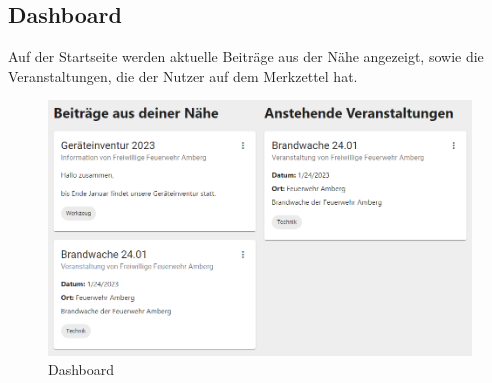 \subsection{Dashboard}
\label{sec:dashboard}

Auf der Startseite werden aktuelle Beiträge aus der Nähe angezeigt, sowie die Veranstaltungen, die der Nutzer auf dem Merkzettel hat.

\begin{figure}[ht!]
  \begin{centering}
    \includegraphics[width=.8\textwidth]{figures/implementation/dashboard.png}
    \caption{Dashboard}
    \label{fig:dashboard}
  \end{centering}
\end{figure}
